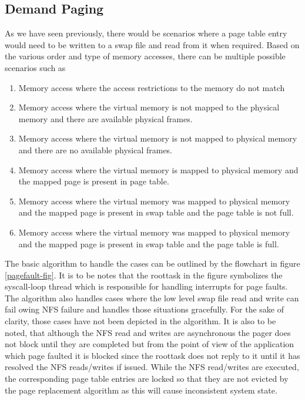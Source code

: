 \documentclass[a4paper, 11pt]{article}
\begin{document}
\subsection{Demand Paging}
As we have seen previously, there would be scenarios where a page
table entry would need to be written to a swap file and read from it
when required. Based on the various order and type of memory accesses,
there can be multiple possible scenarios such as
\begin{enumerate}
\item Memory access where the access restrictions to the memory do not
  match
\item Memory access where the virtual memory is not mapped to the
  physical memory and there are available physical frames.
\item Memory access where the virtual memory is not mapped to physical
  memory and there are no available physical frames.
\item Memory access where the virtual memory is mapped to physical
  memory and the mapped page is present in page table.
\item Memory access where the virtual memory was mapped to physical
  memory and the mapped page is present in swap table and the page
  table is not full.
\item Memory access where the virtual memory was mapped to physical
  memory and the mapped page is present in swap table and the page
  table is full.
\end{enumerate}
The basic algorithm to handle the cases can be outlined by the
flowchart in figure \ref{pagefault-fig}. It is to be notes that the
roottask in the figure symbolizes the syscall-loop thread which is
responsible for handling interrupts for page faults. The algorithm also
handles cases where the low level swap file read and write can fail
owing NFS failure and handles those situations gracefully. For the
sake of clarity, those cases have not been depicted in the algorithm.
It is also to be noted, that although the NFS read and writes are
asynchronous the pager does not block until they are completed but
from the point of view of the application which page faulted it is
blocked since the roottask does not reply to it until it has resolved
the NFS reads/writes if issued. While the NFS read/writes are executed,
the corresponding page table entries are locked so that they are not
evicted by the page replacement algorithm as this will cause
inconsistent system state.
\end{document}
